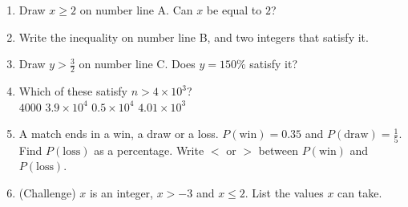 \documentclass{beamer}
\newcommand{\ashow}[1]{\uncover<2->{\textcolor{red}{\small #1}}}
\newcommand{\tightlist}{%
  \setlength{\itemsep}{0pt}\setlength{\parskip}{0pt}\setlength{\topsep}{0pt}%
}
\begin{document}
\begin{frame}
\begin{columns}[T,onlytextwidth]
\vspace{-1.5em}
\footnotesize
\begin{enumerate}\tightlist
{}
  \item Draw $x\geq2$ on number line A. Can $x$ be equal to $2$?
        \ashow{Yes: $\geq$ includes $2$, so the circle is filled.}
  \item Write the inequality on number line B, and two integers that satisfy it.
        \ashow{$x<-1$; \; for example $-2$ and $-3$}
  \item Draw $y>\frac32$ on number line C. Does $y=150\%$ satisfy it?
        \ashow{No: $150\%=\tfrac32$, not more than $\tfrac32$.}
  \item Which of these satisfy $n>4\times10^3$?\\[1pt]
        \hspace*{1em}$4000$ \quad $3.9\times10^4$ \quad $0.5\times10^4$ \quad $4.01\times10^3$\\
        \ashow{All except $4000$, which equals $4\times10^3$}
  \item A match ends in a win, a draw or a loss. $P(\text{win})=0.35$ and
        $P(\text{draw})=\frac15$. Find $P(\text{loss})$ as a percentage. Write $<$ or $>$
        between $P(\text{win})$ and $P(\text{loss})$.
        \ashow{$45\%$, so $P(\text{win})<P(\text{loss})$}
  \item (Challenge) $x$ is an integer, $x>-3$ and $x\leq2$. List the values $x$ can take.
        \ashow{$-2,\ -1,\ 0,\ 1,\ 2$}
\end{enumerate}
\end{columns}
\end{frame}
\end{document}

